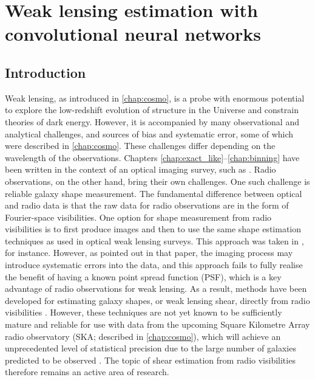 
% 
% 

% 

\chapter{Weak lensing estimation with convolutional neural networks}
\label{chap:cnn}
\graphicspath{{../Figs/cnn/}{Figs/cnn/}}

\section{Introduction}
\label{ml_Sec:intro}

Weak lensing, as introduced in \autoref{chap:cosmo}, is a probe with enormous potential to explore the low-redshift evolution of structure in the Universe and constrain theories of dark energy. However, it is accompanied by many observational and analytical challenges, and sources of bias and systematic error, some of which were described in \autoref{chap:cosmo}. These challenges differ depending on the wavelength of the observations. Chapters \ref{chap:exact_like}--\ref{chap:binning} have been written in the context of an optical imaging survey, such as \Euclid{}. Radio observations, on the other hand, bring their own challenges. One such challenge is reliable galaxy shape measurement. The fundamental difference between optical and radio data is that the raw data for radio observations are in the form of Fourier-space visibilities. One option for shape measurement from radio visibilities is to first produce images and then to use the same shape estimation techniques as used in optical weak lensing surveys. This approach was taken in \citet{Hillier2019}, for instance. However, as pointed out in that paper, the imaging process may introduce systematic errors into the data, and this approach fails to fully realise the benefit of having a known point spread function (PSF), which is a key advantage of radio observations for weak lensing. As a result, methods have been developed for estimating galaxy shapes, or weak lensing shear, directly from radio visibilities \citep{Rivi2016, Rivi2018, Rivi2019, Hillier2020, Harrison2020}. However, these techniques are not yet known to be sufficiently mature and reliable for use with data from the upcoming Square Kilometre Array radio observatory (SKA; described in \autoref{chap:cosmo}), which will achieve an unprecedented level of statistical precision due to the large number of galaxies predicted to be observed \citep{Brown2015}. The topic of shear estimation from radio visibilities therefore remains an active area of research.

